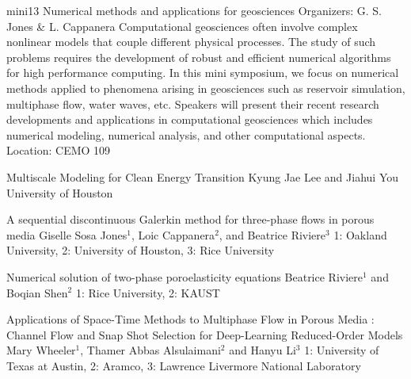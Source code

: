 \mini
{mini13}
{Numerical methods and applications for geosciences}
{Organizers: G. S. Jones \& L. Cappanera}
{Computational geosciences often involve complex nonlinear models that couple different physical processes. The study of such problems requires the development of robust and efficient numerical algorithms for high performance computing. In this mini symposium, we focus on numerical methods applied to phenomena arising in geosciences such as reservoir simulation, multiphase flow, water waves, etc. Speakers will present their recent research developments and applications in computational geosciences which includes numerical modeling, numerical analysis, and other computational aspects.}
{Location: CEMO 109}

\begin{talks}
\item\talk
{Multiscale Modeling for Clean Energy Transition}
{Kyung Jae Lee and Jiahui You}
{University of Houston}
\item\talk
{A sequential discontinuous Galerkin method for three-phase flows in porous media}
{Giselle Sosa Jones$^{1}$, Loic Cappanera$^{2}$, and Beatrice Riviere$^{3}$}
{1: Oakland University, 2: University of Houston, 3: Rice University}
\item\talk
{Numerical solution of two-phase poroelasticity equations}
{Beatrice Riviere$^{1}$ and Boqian Shen$^{2}$}
{1: Rice University, 2: KAUST}
\item\talk
{Applications of Space-Time Methods to Multiphase Flow in Porous Media  :  Channel Flow and  Snap Shot Selection for Deep-Learning Reduced-Order Models }
{Mary Wheeler$^{1}$, Thamer  Abbas Alsulaimani$^{2}$ and Hanyu Li$^{3}$}
{1: University of Texas at Austin, 2: Aramco, 3: Lawrence Livermore National Laboratory}
\end{talks}
\room
